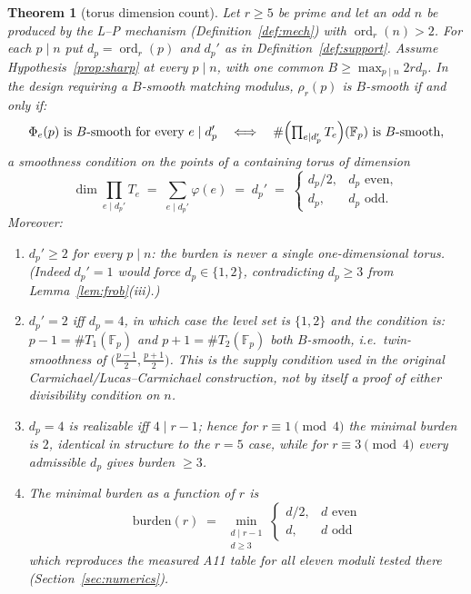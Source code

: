 \documentclass[11pt]{article}
\newtheorem{theorem}{Theorem}[section]
\theoremstyle{remark}
\newcommand{\F}{\mathbb{F}}
\DeclareMathOperator{\ord}{ord}
\begin{document}
\begin{theorem}[torus dimension count]\label{thm:dimcount}
Let $r\ge5$ be prime and let an odd $n$ be produced by the L--P mechanism
(Definition~\ref{def:mech}) with $\ord_r(n) > 2$. For each $p \mid n$ put
$d_p = \ord_r(p)$ and $d_p'$ as in Definition~\ref{def:support}. Assume
Hypothesis~\ref{prop:sharp} at every $p\mid n$, with one common
$B\ge\max_{p\mid n}2rd_p$. In the design requiring a $B$-smooth matching
modulus, $\rho_r(p)$ is $B$-smooth if and only if:
\[
\Phi_e(p) \ \text{is $B$-smooth for every } e \mid d_p'
\quad\Longleftrightarrow\quad
\#\Bigl(\textstyle\prod_{e \mid d_p'} T_e\Bigr)(\F_p) \ \text{is $B$-smooth},
\]
a smoothness condition on the points of a \emph{containing} torus of dimension
\[
\dim \prod_{e \mid d_p'} T_e \;=\; \sum_{e \mid d_p'} \varphi(e) \;=\; d_p'
\;=\;
\begin{cases}
d_p/2, & d_p \text{ even},\\
d_p, & d_p \text{ odd}.
\end{cases}
\]
Moreover:
\begin{enumerate}
\item[(a)] $d_p' \ge 2$ for every $p \mid n$: the burden is never a single
one-dimensional torus. (Indeed $d_p' = 1$ would force $d_p \in \{1,2\}$,
contradicting $d_p \ge 3$ from Lemma~\ref{lem:frob}(iii).)
\item[(b)] $d_p' = 2$ iff $d_p = 4$, in which case the level set is
$\{1,2\}$ and the condition is: $p - 1 = \#T_1(\F_p)$ and
$p + 1 = \#T_2(\F_p)$ both $B$-smooth, i.e.\ twin-smoothness of
$\bigl(\tfrac{p-1}{2}, \tfrac{p+1}{2}\bigr)$. This is the supply condition
used in the original Carmichael/Lucas--Carmichael construction, not by itself
a proof of either divisibility condition on $n$.
\item[(c)] $d_p = 4$ is realizable iff $4 \mid r - 1$; hence for
$r \equiv 1 \pmod 4$ the minimal burden is $2$, identical in structure to
the $r = 5$ case, while for $r \equiv 3 \pmod 4$ every admissible $d_p$
gives burden $\ge 3$.
\item[(d)] The minimal burden as a function of $r$ is
\[
\mathrm{burden}(r) \;=\; \min_{\substack{d \mid r-1\\ d \ge 3}}
\begin{cases} d/2, & d \text{ even}\\ d, & d \text{ odd}\end{cases}
\]
which reproduces the measured A11 table for all eleven moduli tested there
(Section~\ref{sec:numerics}).
\end{enumerate}
\end{theorem}
\end{document}
